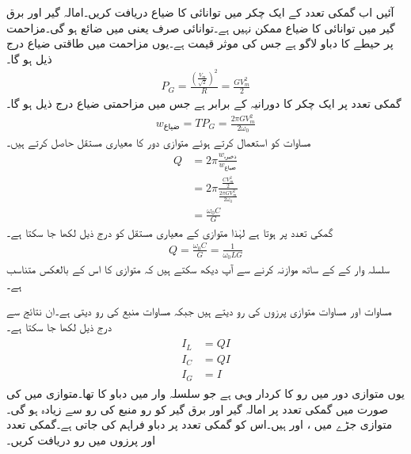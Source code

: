 آئیں اب گمکی تعدد کے ایک چکر میں توانائی کا ضیاع دریافت کریں۔امالہ گیر اور برق گیر میں توانائی کا ضیاع ممکن نہیں ہے۔توانائی صرف  یعنی  میں ضائع ہو گی۔مزاحمت پر  حیطے کا دباو لاگو ہے جس کی موثر قیمت  ہے۔یوں مزاحمت میں طاقتی ضیاع درج ذیل ہو گا۔
\begin{align*}
P_G=\frac{\left(\frac{V_m}{\sqrt{2}}\right)^2}{R}=\frac{GV_m^2}{2}
\end{align*}
گمکی تعدد پر ایک چکر کا دورانیہ  کے برابر ہے جس میں مزاحمتی ضیاع درج ذیل ہو گا۔
\begin{align}
w_{\text{ضیاع}}=T P_G=\frac{2\pi GV_m^2}{2\omega_0}
\end{align}
مساوات  کو استعمال کرتے ہوئے متوازی  دور کا معیاری مستقل حاصل کرتے ہیں۔
\begin{align*}
Q&=2\pi \frac{w_{\text{ذخیرہ}}}{w_{\text{ضیاع}}}\\
&=2\pi \frac{\frac{CV_m^2}{2}}{\frac{2\pi GV_m^2}{2\omega_0}}\\
&=\frac{\omega_0 C}{G}
\end{align*}
گمکی تعدد پر  ہوتا ہے لہٰذا  متوازی  کے معیاری مستقل کو درج ذیل لکھا جا سکتا ہے۔
\begin{align}
Q=\frac{\omega_0 C}{G}=\frac{1}{\omega_0 L G}
\end{align}
سلسلہ وار  کے  کے ساتھ موازنہ کرنے سے آپ دیکھ سکتے ہیں کہ متوازی  کا  اس کے بالعکس متناسب ہے۔

مساوات  اور مساوات  متوازی پرزوں کی رو دیتے ہیں جبکہ مساوات  منبع کی رو دیتی ہے۔ان نتائج سے درج ذیل لکھا جا سکتا ہے۔
\begin{gather}
\begin{aligned}
I_L&=Q I\\
I_C&=Q I\\
I_G&=I
\end{aligned}
\end{gather}
یوں متوازی  دور میں رو کا کردار وہی ہے جو سلسلہ وار  میں دباو کا تھا۔متوازی  میں  کی صورت میں گمکی تعدد پر امالہ گیر اور برق گیر کو رو منبع کی رو سے زیادہ ہو گی۔ 
متوازی جڑے  میں ،  اور  ہیں۔اس کو گمکی تعدد پر  دباو فراہم کی جاتی ہے۔گمکی تعدد اور پرزوں میں رو دریافت کریں۔ 

